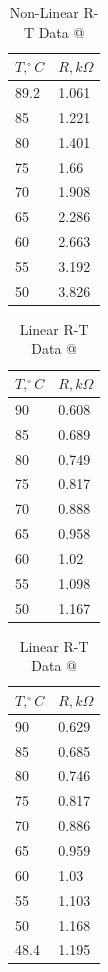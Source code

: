 \documentclass[a4,11pt]{article}
\makeatletter
\newcommand*{\rom}[1]{\expandafter\@slowromancap\romannumeral #1@}
\makeatother
\begin{document}
\begin{table}[H]
	\centering
	\caption{Non-Linear R-T Data \rom{3}}
	\begin{tabular}{l|l}
		\hline
		$T, ^{\circ}C$ & $R, k\Omega$ \\
		\hline
		89.2 & 1.061  \\
		85 & 1.221  \\
		80 & 1.401  \\
		75 & 1.66  \\
		70 & 1.908  \\
		65 & 2.286  \\
		60 & 2.663  \\
		55 & 3.192  \\
		50 & 3.826  \\
		\hline
	\end{tabular}
\end{table}

\begin{table}[H]
	\centering
	\caption{Linear R-T Data \rom{1}}
	\begin{tabular}{l|l}
		\hline
		$T, ^{\circ}C$ & $R, k\Omega$ \\
		\hline
		90 & 0.608  \\
		85 & 0.689  \\
		80 & 0.749  \\
		75 & 0.817  \\
		70 & 0.888  \\
		65 & 0.958  \\
		60 & 1.02  \\
		55 & 1.098  \\
		50 & 1.167  \\
	\end{tabular}
\end{table}

\begin{table}[H]
	\centering
	\caption{Linear R-T Data \rom{2}}
	\begin{tabular}{l|l}
		\hline
		$T, ^{\circ}C$ & $R, k\Omega$ \\
		\hline
		90 & 0.629  \\
		85 & 0.685  \\
		80 & 0.746  \\
		75 & 0.817  \\
		70 & 0.886  \\
		65 & 0.959  \\
		60 & 1.03  \\
		55 & 1.103  \\
		50 & 1.168  \\
		48.4 & 1.195  \\
		\hline
	\end{tabular}
\end{table}
\end{document}
